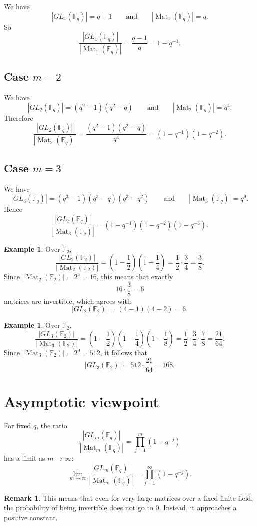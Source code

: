 \documentclass[11pt]{article}
\newcommand{\F}{\mathbb{F}}
\newcommand{\Mat}{\operatorname{Mat}}
\theoremstyle{definition}
\newtheorem{example}[definition]{Example}
\newtheorem{remark}[definition]{Remark}
\theoremstyle{plain}
\begin{document}
	We have
	\[
	|GL_1(\F_q)|=q-1
	\qquad\text{and}\qquad
	|\Mat_1(\F_q)|=q.
	\]
	So
	\[
	\frac{|GL_1(\F_q)|}{|\Mat_1(\F_q)|}
	=
	\frac{q-1}{q}
	=
	1-q^{-1}.
	\]
	
	\subsection{Case \(m=2\)}
	
	We have
	\[
	|GL_2(\F_q)|=(q^2-1)(q^2-q)
	\qquad\text{and}\qquad
	|\Mat_2(\F_q)|=q^4.
	\]
	Therefore
	\[
	\frac{|GL_2(\F_q)|}{|\Mat_2(\F_q)|}
	=
	\frac{(q^2-1)(q^2-q)}{q^4}
	=
	(1-q^{-1})(1-q^{-2}).
	\]
	
	\subsection{Case \(m=3\)}
	
	We have
	\[
	|GL_3(\F_q)|=(q^3-1)(q^3-q)(q^3-q^2)
	\qquad\text{and}\qquad
	|\Mat_3(\F_q)|=q^9.
	\]
	Hence
	\[
	\frac{|GL_3(\F_q)|}{|\Mat_3(\F_q)|}
	=
	(1-q^{-1})(1-q^{-2})(1-q^{-3}).
	\]
	
	\begin{example}
		Over \(\F_2\),
		\[
		\frac{|GL_2(\F_2)|}{|\Mat_2(\F_2)|}
		=
		\left(1-\frac12\right)\left(1-\frac14\right)
		=
		\frac12\cdot\frac34
		=
		\frac38.
		\]
		Since \(|\Mat_2(\F_2)|=2^4=16\), this means that exactly
		\[
		16\cdot \frac38=6
		\]
		matrices are invertible, which agrees with
		\[
		|GL_2(\F_2)|=(4-1)(4-2)=6.
		\]
	\end{example}
	
	\begin{example}
		Over \(\F_2\),
		\[
		\frac{|GL_3(\F_2)|}{|\Mat_3(\F_2)|}
		=
		\left(1-\frac12\right)\left(1-\frac14\right)\left(1-\frac18\right)
		=
		\frac12\cdot\frac34\cdot\frac78
		=
		\frac{21}{64}.
		\]
		Since \(|\Mat_3(\F_2)|=2^9=512\), it follows that
		\[
		|GL_3(\F_2)|=512\cdot \frac{21}{64}=168.
		\]
	\end{example}
	
	\section{Asymptotic viewpoint}
	
	For fixed \(q\), the ratio
	\[
	\frac{|GL_m(\F_q)|}{|\Mat_m(\F_q)|}
	=
	\prod_{j=1}^{m}(1-q^{-j})
	\]
	has a limit as \(m\to\infty\):
	\[
	\lim_{m\to\infty}\frac{|GL_m(\F_q)|}{|\Mat_m(\F_q)|}
	=
	\prod_{j=1}^{\infty}(1-q^{-j}).
	\]
	
	\begin{remark}
		This means that even for very large matrices over a fixed finite field, the probability of being invertible does not go to \(0\). Instead, it approaches a positive constant.
	\end{remark}
	
\end{document}

